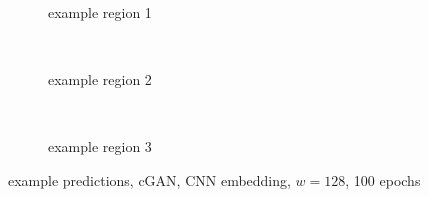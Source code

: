 \begin{figure}[p] %
    \begin{subfigure}{\textwidth}
        \centering
        \caption{example  region 1} \label{fig:results:cGAN128_r1}
    \end{subfigure}\\[3mm]
    \begin{subfigure}{\textwidth}
        \centering
        \caption{example region 2} \label{fig:results:cGAN128_r2}
    \end{subfigure}\\[3mm]
    \begin{subfigure}{\textwidth}
        \centering
        \caption{example region 3} \label{fig:results:cGAN128_r3}
    \end{subfigure}
    \caption{example predictions, cGAN, CNN embedding, $w=128$, 100 epochs} \label{fig:results:cGAN128_matrices}
\end{figure}

